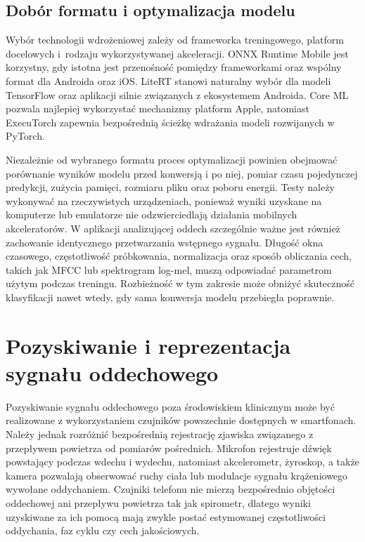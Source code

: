 \subsection{Dobór formatu i optymalizacja modelu}

Wybór technologii wdrożeniowej zależy od frameworka treningowego, platform docelowych i~rodzaju wykorzystywanej akceleracji. ONNX Runtime Mobile jest korzystny, gdy istotna jest przenośność pomiędzy frameworkami oraz wspólny format dla Androida oraz iOS. LiteRT stanowi naturalny wybór dla modeli TensorFlow oraz aplikacji silnie związanych z ekosystemem Androida. Core ML pozwala najlepiej wykorzystać mechanizmy platform Apple, natomiast ExecuTorch zapewnia bezpośrednią ścieżkę wdrażania modeli rozwijanych w PyTorch.

Niezależnie od wybranego formatu proces optymalizacji powinien obejmować porównanie wyników modelu przed konwersją i po niej, pomiar czasu pojedynczej predykcji, zużycia pamięci, rozmiaru pliku oraz poboru energii. Testy należy wykonywać na rzeczywistych urządzeniach, ponieważ wyniki uzyskane na komputerze lub emulatorze nie odzwierciedlają działania mobilnych akceleratorów. W aplikacji analizującej oddech szczególnie ważne jest również zachowanie identycznego przetwarzania wstępnego sygnału. Długość okna czasowego, częstotliwość próbkowania, normalizacja oraz sposób obliczania cech, takich jak MFCC lub spektrogram log-mel, muszą odpowiadać parametrom użytym podczas treningu. Rozbieżność w tym zakresie może obniżyć skuteczność klasyfikacji nawet wtedy, gdy sama konwersja modelu przebiegła poprawnie.

\section{Pozyskiwanie i reprezentacja sygnału oddechowego}

Pozyskiwanie sygnału oddechowego poza środowiskiem klinicznym może być realizowane z wykorzystaniem czujników powszechnie dostępnych w smartfonach. Należy jednak rozróżnić bezpośrednią rejestrację zjawiska związanego z przepływem powietrza od pomiarów pośrednich. Mikrofon rejestruje dźwięk powstający podczas wdechu i wydechu, natomiast akcelerometr, żyroskop, a także kamera pozwalają obserwować ruchy ciała lub modulacje sygnału krążeniowego wywołane oddychaniem. Czujniki telefonu nie mierzą bezpośrednio objętości oddechowej ani przepływu powietrza tak jak spirometr, dlatego wyniki uzyskiwane za ich pomocą mają zwykle postać estymowanej częstotliwości oddychania, faz cyklu czy cech jakościowych.

